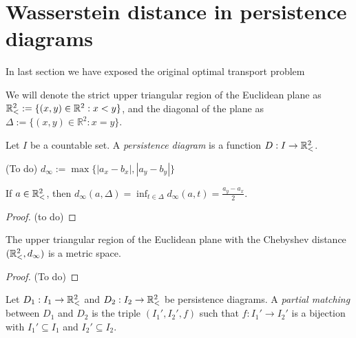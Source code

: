 \section{Wasserstein distance in persistence diagrams}

In last section we have exposed the original optimal transport problem

We will denote the strict upper triangular region of the Euclidean plane as $ \mathbb{R}_<^2 := \{(x, y) \in \mathbb R^2 : x < y\} $, and the diagonal of the plane as $ \Delta := \{(x, y) \in \mathbb R^2 : x = y\}$.

\begin{definition}
    Let $ I $ be a countable set. A {\it persistence diagram} is a function $ D: I \to \mathbb{R}_<^2 $.
\end{definition}

\begin{definition}(To do)
    $d_\infty := \max \{|a_x - b_x|, |a_y - b_y|\}$
\end{definition}

\begin{proposition}
    If $ a \in \mathbb{R}_<^2 $, then $ d_\infty(a, \Delta) = \inf_{t \in \Delta} d_\infty(a, t) = \frac{a_y - a_x}{2} $.
\end{proposition}
\begin{proof}
    (to do)  
\end{proof}

\begin{proposition}
    The upper triangular region of the Euclidean plane with the Chebyshev distance  $ (\mathbb{R}_<^2, d_\infty) $ is a metric space.
\end{proposition}
\begin{proof}
    (To do)
\end{proof}

\begin{definition}
    Let $ D_1: I_1 \to \mathbb{R}_<^2 $ and $ D_2: I_2 \to \mathbb{R}_<^2 $ be persistence diagrams. A {\it partial matching} between $ D_1 $ and $ D_2 $ is the triple $ (I_1', I_2', f) $ such that $ f: I_1' \to I_2' $ is a bijection with $ I_1' \subseteq I_1 $ and $ I_2' \subseteq I_2 $.
\end{definition}

